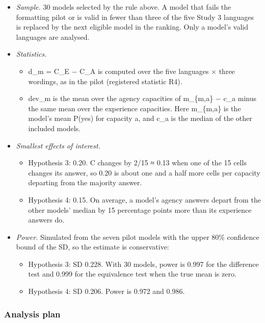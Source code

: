 \documentclass[
  11pt,
]{article}
\providecommand{\tightlist}{%
  \setlength{\itemsep}{0pt}\setlength{\parskip}{0pt}}
\begin{document}
\begin{itemize}
\tightlist
\item
  \emph{Sample.} 30 models selected by the rule above. A model that
  fails the formatting pilot or is valid in fewer than three of the five
  Study 3 languages is replaced by the next eligible model in the
  ranking. Only a model's valid languages are analysed.
\item
  \emph{Statistics.}

  \begin{itemize}
  \tightlist
  \item
    d\_m = C\_E − C\_A is computed over the five languages × three
    wordings, as in the pilot (registered statistic R4).
  \item
    dev\_m is the mean over the agency capacities of \textbar m\_\{m,a\}
    − c\_a\textbar{} minus the same mean over the experience capacities.
    Here m\_\{m,a\} is the model's mean P(yes) for capacity a, and c\_a
    is the median of the other included models.
  \end{itemize}
\item
  \emph{Smallest effects of interest.}

  \begin{itemize}
  \tightlist
  \item
    Hypothesis 3: 0.20. C changes by 2/15 ≈ 0.13 when one of the 15
    cells changes its answer, so 0.20 is about one and a half more cells
    per capacity departing from the majority answer.
  \item
    Hypothesis 4: 0.15. On average, a model's agency answers depart from
    the other models' median by 15 percentage points more than its
    experience answers do.
  \end{itemize}
\item
  \emph{Power.} Simulated from the seven pilot models with the upper
  80\% confidence bound of the SD, so the estimate is conservative:

  \begin{itemize}
  \tightlist
  \item
    Hypothesis 3: SD 0.228. With 30 models, power is 0.997 for the
    difference test and 0.999 for the equivalence test when the true
    mean is zero.
  \item
    Hypothesis 4: SD 0.206. Power is 0.972 and 0.986.
  \end{itemize}
\end{itemize}

\hypertarget{analysis-plan}{%
\subsubsection{Analysis plan}\label{analysis-plan}}
\end{document}
